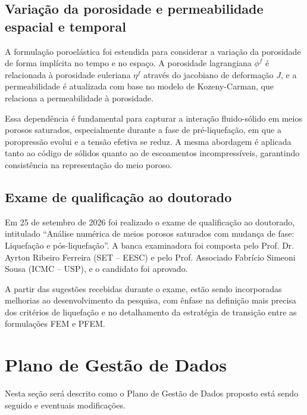 \subsection{Variação da porosidade e permeabilidade espacial e temporal}

A formulação poroelástica foi estendida para considerar a variação da porosidade de forma implícita no tempo e no espaço. A porosidade lagrangiana $\phi^f$ é relacionada à porosidade euleriana $\eta^f$ através do jacobiano de deformação $J$, e a permeabilidade é atualizada com base no modelo de Kozeny-Carman, que relaciona a permeabilidade à porosidade.

Essa dependência é fundamental para capturar a interação fluido-sólido em meios porosos saturados, especialmente durante a fase de pré-liquefação, em que a poropressão evolui e a tensão efetiva se reduz. A mesma abordagem é aplicada tanto ao código de sólidos quanto ao de escoamentos incompressíveis, garantindo consistência na representação do meio poroso.

\subsection{Exame de qualificação ao doutorado}

Em 25 de setembro de 2026 foi realizado o exame de qualificação ao doutorado, intitulado ``Análise numérica de meios porosos saturados com mudança de fase: Liquefação e pós-liquefação''. A banca examinadora foi composta pelo Prof. Dr. Ayrton Ribeiro Ferreira (SET -- EESC) e pelo Prof. Associado Fabrício Simeoni Sousa (ICMC -- USP), e o candidato foi aprovado.

A partir das sugestões recebidas durante o exame, estão sendo incorporadas melhorias ao desenvolvimento da pesquisa, com ênfase na definição mais precisa dos critérios de liquefação e no detalhamento da estratégia de transição entre as formulações FEM e PFEM.

\section{Plano de Gestão de Dados}

Nesta seção será descrito como o Plano de Gestão de Dados proposto está sendo seguido e eventuais modificações.


